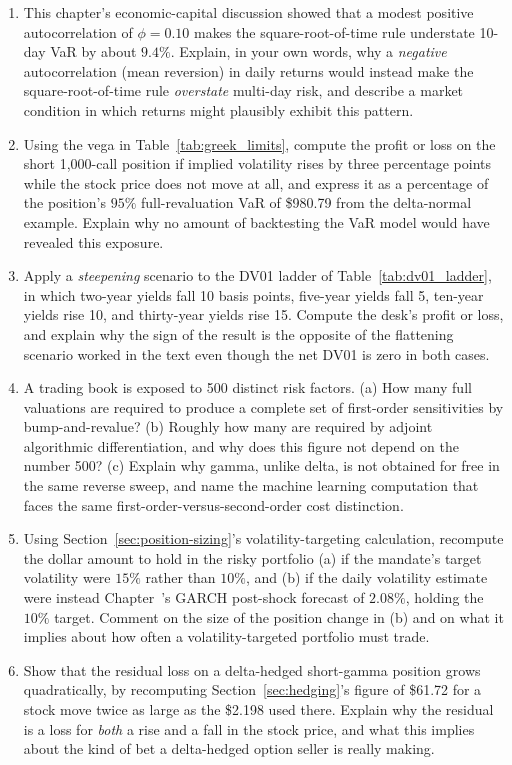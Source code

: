 \documentclass[../ai_in_finance]{subfiles}
\begin{document}
\begin{enumerate}[exercises]
    \item This chapter's economic-capital discussion showed that a modest positive autocorrelation of $\phi=0.10$ makes the square-root-of-time rule understate 10-day VaR by about $9.4\%$. Explain, in your own words, why a \emph{negative} autocorrelation (mean reversion) in daily returns would instead make the square-root-of-time rule \emph{overstate} multi-day risk, and describe a market condition in which returns might plausibly exhibit this pattern.
    \item Using the vega in Table~\ref{tab:greek_limits}, compute the profit or loss on the short 1,000-call position if implied volatility rises by three percentage points while the stock price does not move at all, and express it as a percentage of the position's $95\%$ full-revaluation VaR of \$980.79 from the delta-normal example. Explain why no amount of backtesting the VaR model would have revealed this exposure.
    \item Apply a \emph{steepening} scenario to the DV01 ladder of Table~\ref{tab:dv01_ladder}, in which two-year yields fall 10 basis points, five-year yields fall 5, ten-year yields rise 10, and thirty-year yields rise 15. Compute the desk's profit or loss, and explain why the sign of the result is the opposite of the flattening scenario worked in the text even though the net DV01 is zero in both cases.
    \item A trading book is exposed to 500 distinct risk factors. (a) How many full valuations are required to produce a complete set of first-order sensitivities by bump-and-revalue? (b) Roughly how many are required by adjoint algorithmic differentiation, and why does this figure not depend on the number 500? (c) Explain why gamma, unlike delta, is not obtained for free in the same reverse sweep, and name the machine learning computation that faces the same first-order-versus-second-order cost distinction.
    \item Using Section~\ref{sec:position-sizing}'s volatility-targeting calculation, recompute the dollar amount to hold in the risky portfolio (a) if the mandate's target volatility were $15\%$ rather than $10\%$, and (b) if the daily volatility estimate were instead Chapter~'s GARCH post-shock forecast of $2.08\%$, holding the $10\%$ target. Comment on the size of the position change in (b) and on what it implies about how often a volatility-targeted portfolio must trade.
    \item Show that the residual loss on a delta-hedged short-gamma position grows quadratically, by recomputing Section~\ref{sec:hedging}'s figure of \$61.72 for a stock move twice as large as the \$2.198 used there. Explain why the residual is a loss for \emph{both} a rise and a fall in the stock price, and what this implies about the kind of bet a delta-hedged option seller is really making.

\end{enumerate}
\end{document}
